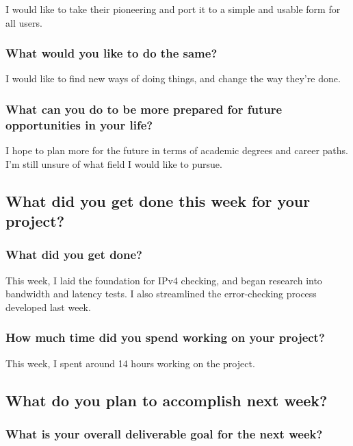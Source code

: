 \documentclass[letterpaper]{article}            %
\begin{document}
I would like to take their pioneering and port it to a simple and usable form for all users.

\subsubsection{What would you like to do the same?}

I would like to find new ways of doing things, and change the way they're done.

\subsubsection{What can you do to be more prepared for future opportunities in your life?}

I hope to plan more for the future in terms of academic degrees and career paths. I'm still unsure of what field I would like to pursue.


\subsection{What did you get done this week for your project?}

\subsubsection{What did you get done?}

This week, I laid the foundation for IPv4 checking, and began research into bandwidth and latency tests. I also streamlined the error-checking process developed last week.

\subsubsection{How much time did you spend working on your project?}

This week, I spent around 14 hours working on the project.


\subsection{What do you plan to accomplish next week?}

\subsubsection{What is your overall deliverable goal for the next week?}
\end{document}

